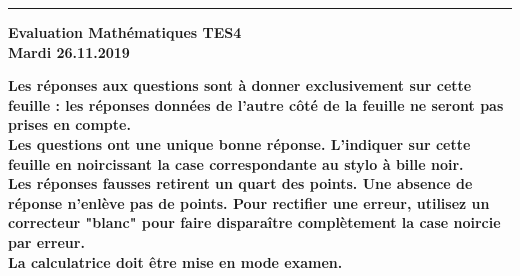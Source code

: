 \documentclass[a4paper]{article}
\begin{document}
{{\begin{center}
\hrule\vspace{1mm}
\end{center}


\clearpage
\AMCdebutFormulaire

\begin{minipage}{.4\linewidth}
\centering\large\bf Evaluation  Mathématiques TES4\\Mardi 26.11.2019 \end{minipage}

\begin{center}
\bf Les réponses aux questions sont à donner exclusivement sur cette feuille : 
les réponses données de l'autre côté de la feuille ne seront pas prises en compte.
\\
Les questions ont une unique bonne réponse. L'indiquer sur cette feuille en noircissant la case correspondante au stylo à bille noir.\\
Les réponses fausses retirent un quart des points. Une absence de réponse n'enlève pas de points.
Pour rectifier une erreur, utilisez un correcteur "blanc" pour faire disparaître complètement la case noircie par erreur.\\
La calculatrice doit être mise en mode examen.
\
\end{center}
\formulaire

}
}
\end{document}

